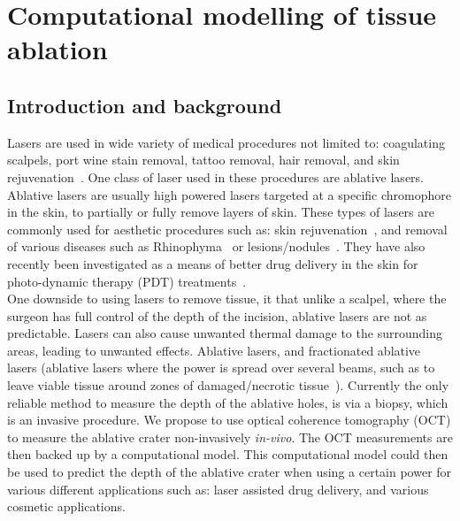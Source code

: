 \chapter{Computational modelling of tissue ablation}





\section{Introduction and background}

Lasers are used in wide variety of medical procedures not limited to: coagulating scalpels, port wine stain removal, tattoo removal, hair removal, and skin rejuvenation~\cite{amini2010ultrafast, tan1989treatment,kuperman2001laser,liew2002laser,hardaway2002nonablative}.
One class of laser used in these procedures are ablative lasers. Ablative lasers are usually high powered lasers targeted at a specific chromophore in the skin, to partially or fully remove layers of skin. These types of lasers are commonly used for aesthetic procedures such as: skin rejuvenation~\cite{hardaway2002nonablative}, and removal of various diseases such as Rhinophyma~\cite{shapshay1980removal} or lesions/nodules~\cite{valcavi2010percutaneous}. They have also recently been investigated as a means of better drug delivery in the skin for photo-dynamic therapy (PDT) treatments~\cite{haedersdal2010fractional}.\\

One downside to using lasers to remove tissue, it that unlike a scalpel, where the surgeon has full control of the depth of the incision, ablative lasers are not as predictable. Lasers can also cause  unwanted thermal damage to the surrounding areas, leading to unwanted effects.
Ablative lasers, and fractionated ablative lasers (ablative lasers where the power is spread over several beams, such as to leave viable tissue around zones of damaged/necrotic tissue~\cite{manstein2004fractional}). Currently the only reliable method to measure the depth of the ablative holes, is via a biopsy, which is an invasive procedure. We propose to use optical coherence tomography (OCT) to measure the ablative crater non-invasively \textit{in-vivo}. The OCT measurements are then backed up by a computational model. This computational model could then be used to predict the depth of the ablative crater when using a certain power for various different applications such as: laser assisted drug delivery, and various cosmetic applications.

